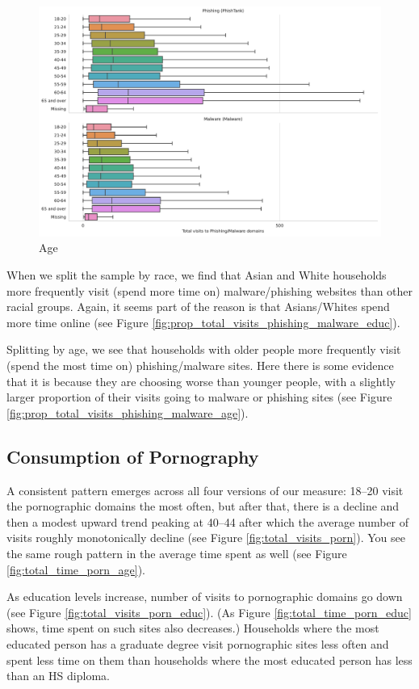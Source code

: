 \documentclass[12pt, letterpaper]{article}
\begin{document}
\begin{figure}[!htb]
\begin{minipage}[b]{0.32\textwidth}
	\includegraphics[width=\textwidth]{figs/total_visits_phishing_malware_age.pdf}\\Age
	\end{minipage}
\end{figure}

When we split the sample by race, we find that Asian and White households more frequently visit (spend more time on) malware/phishing websites than other racial groups. Again, it seems part of the reason is that Asians/Whites spend more time online (see Figure \ref{fig:prop_total_visits_phishing_malware_educ}).

Splitting by age, we see that households with older people more frequently visit (spend the most time on) phishing/malware sites. Here there is some evidence that it is because they are choosing worse than younger people, with a slightly larger proportion of their visits going to malware or phishing sites (see Figure \ref{fig:prop_total_visits_phishing_malware_age}).

\subsection{Consumption of Pornography}
A consistent pattern emerges across all four versions of our measure: 18--20 visit the pornographic domains the most often, but after that, there is a decline and then a modest upward trend peaking at 40--44 after which the average number of visits roughly monotonically decline (see Figure \ref{fig:total_visits_porn}). You see the same rough pattern in the average time spent as well (see Figure \ref{fig:total_time_porn_age}).

As education levels increase, number of visits to pornographic domains go down (see Figure \ref{fig:total_visits_porn_educ}). (As Figure \ref{fig:total_time_porn_educ} shows, time spent on such sites also decreases.) Households where the most educated person has a graduate degree visit pornographic sites less often and spent less time on them than households where the most educated person has less than an HS diploma.
\end{document}
